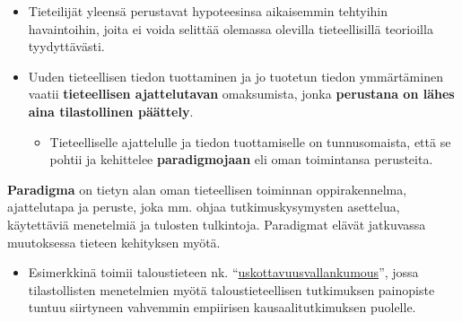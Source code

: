 \documentclass[
]{book}
\providecommand{\tightlist}{%
  \setlength{\itemsep}{0pt}\setlength{\parskip}{0pt}}
\begin{document}
\hfill\break
\hfill\break

\begin{itemize}
\tightlist
\item
  Tieteilijät yleensä perustavat hypoteesinsa aikaisemmin tehtyihin havaintoihin, joita ei voida selittää olemassa olevilla tieteellisillä teorioilla tyydyttävästi.
\item
  Uuden tieteellisen tiedon tuottaminen ja jo tuotetun tiedon ymmärtäminen vaatii \textbf{tieteellisen ajattelutavan} omaksumista, jonka \textbf{perustana on lähes aina tilastollinen päättely}.

  \begin{itemize}
  \tightlist
  \item
    Tieteelliselle ajattelulle ja tiedon tuottamiselle on tunnusomaista, että se pohtii ja kehittelee \textbf{paradigmojaan} eli oman toimintansa perusteita.
  \end{itemize}
\end{itemize}

\begin{defblock}{}

\textbf{Paradigma} on tietyn alan oman tieteellisen toiminnan oppirakennelma, ajattelutapa ja peruste, joka mm. ohjaa tutkimuskysymysten asettelua, käytettäviä menetelmiä ja tulosten tulkintoja. Paradigmat elävät jatkuvassa muutoksessa tieteen kehityksen myötä.

\begin{itemize}
\tightlist
\item
  Esimerkkinä toimii taloustieteen nk. ``\href{https://www.taloustieteellinenyhdistys.fi/wp-content/uploads/2019/10/KAK_3_2019_nettiin-5-8.pdf}{uskottavuusvallankumous}'', jossa tilastollisten menetelmien myötä taloustieteellisen tutkimuksen painopiste tuntuu siirtyneen vahvemmin empiirisen kausaalitutkimuksen puolelle.
\end{itemize}

\end{defblock}
\end{document}
